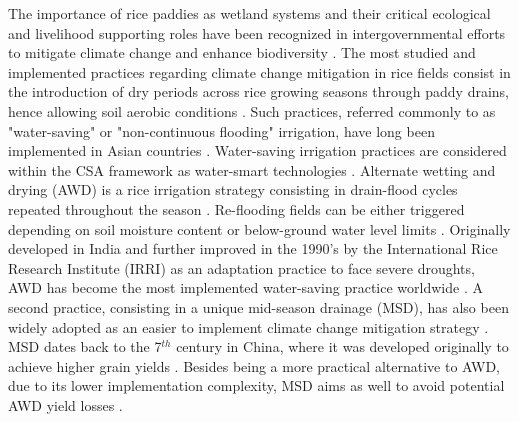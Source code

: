 The importance of rice paddies as wetland systems and their critical ecological and livelihood supporting roles have been recognized in intergovernmental efforts to mitigate climate change and enhance biodiversity \citep{revised1996ipcc, watson2000land, cop102008enhancing}. The most studied and implemented practices regarding climate change mitigation in rice fields consist in the introduction of dry periods across rice growing seasons through paddy drains, hence allowing soil aerobic conditions \citep{sass1992, ratering1998}. Such practices, referred commonly to as "water-saving" or "non-continuous flooding" irrigation, have long been implemented in Asian countries \citep{sandhu1981irrigation}. Water-saving irrigation practices are considered  within the CSA framework as water-smart technologies \citep{das2024}. Alternate wetting and drying (AWD) is a rice irrigation strategy consisting in drain-flood cycles repeated throughout the season \citep{li2004}. Re-flooding fields can be either triggered depending on soil moisture content or below-ground water level limits \citep{bouman2007a, lahue2016, carrijo2017}. Originally developed in India \citep{lampayan2015} and further improved in the 1990's by the International Rice Research Institute (IRRI) as an adaptation practice to face severe droughts, AWD has become the most implemented water-saving practice worldwide \citep{minamikawa2019}. A second practice, consisting in a unique mid-season drainage (MSD), has also been widely adopted as an easier to implement climate change mitigation strategy \citep{perry2022}. MSD dates back to the 7$^{th}$ century in China, where it was developed originally to achieve higher grain yields \citep{minamikawa2019}. Besides being a more practical alternative to AWD, due to its lower implementation complexity, MSD aims as well to avoid potential AWD yield losses \citep{carrijo2017}.\\


